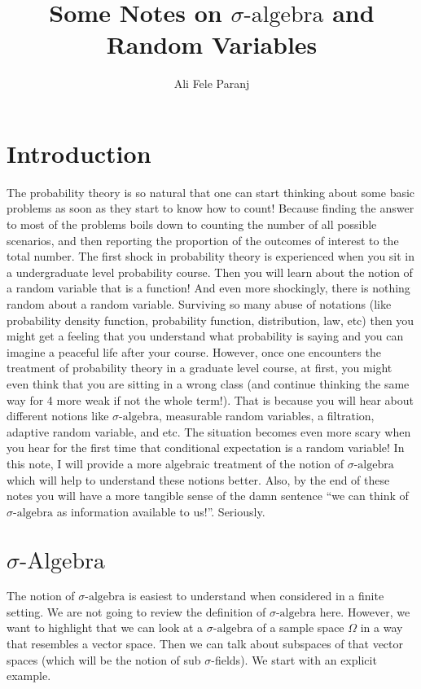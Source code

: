 \documentclass[11pt,a4paper]{article}
\title{Some Notes on $\sigma\text{-algebra}$ and Random Variables}
\author{Ali Fele Paranj}
\theoremstyle{definition}
\begin{document}
	
	\maketitle
	
	
	\section{Introduction}
	The probability theory is so natural that one can start thinking about some basic problems as soon as they start to know how to count! Because finding the answer to most of the problems boils down to counting the number of all possible scenarios, and then reporting the proportion of the outcomes of interest to the total number. The first shock in probability theory is experienced when you sit in a undergraduate level probability course. Then you will learn about the notion of a random variable that is a function! And even more shockingly, there is nothing random about a random variable. Surviving so many abuse of notations (like probability density function, probability function, distribution, law, etc) then you might get a feeling that you understand what probability is saying and you can imagine a peaceful life after your course. However, once one encounters the treatment of probability theory in a graduate level course, at first, you might even think that you are sitting in a wrong class (and continue thinking the same way for 4 more weak if not the whole term!). That is because you will hear about different notions like $\sigma\text{-algebra}$, measurable random variables, a filtration, adaptive random variable, and etc. The situation becomes even more scary when you hear for the first time that conditional expectation is a random variable! In this note, I will provide a more algebraic treatment of the notion of $\sigma\text{-algebra}$ which will help to understand these notions better. Also, by the end of these notes you will have a more tangible sense of the damn sentence ``we can think of $\sigma\text{-algebra}$ as information available to us!''. Seriously.
	
	
	\section{$\sigma\text{-Algebra}$}
	The notion of $\sigma\text{-algebra}$ is easiest to understand when considered in a finite setting. We are not going to review the definition of $\sigma\text{-algebra}$ here. However, we want to highlight that we can look at a $\sigma\text{-algebra}$ of a sample space $ \Omega $ in a way that resembles a vector space. Then we can talk about subspaces of that vector spaces (which will be the notion of sub $ \sigma $-fields). We start with an explicit example.
	
\end{document}
